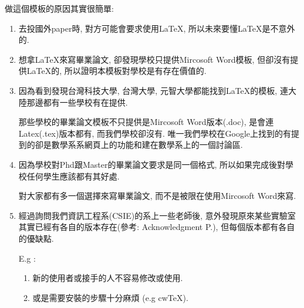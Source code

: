 

做這個模板的原因其實很簡單:

\begin{enumerate}
  \item
  {
    去投國外paper時, 對方可能會要求使用LaTeX, 所以未來要懂LaTeX是不意外的.
  } %

  \item
  {
    想拿LaTeX來寫畢業論文, 卻發現學校只提供Mircosoft Word模板, 但卻沒有提供LaTeX的, 所以證明本模板對學校是有存在價值的.
  } %

  \item
  {
    因為看到發現台灣科技大學\cite{web:latex:template:ntust}, 台灣大學\cite{web:latex:template:ntu}, 元智大學\cite{web:latex:yzu}都能找到LaTeX的模板, 連大陸那邊都有一些學校有在提供.

    那些學校的畢業論文模板不只提供是Mircosoft Word版本(.doc), 是會連Latex(.tex)版本都有, 而我們學校卻沒有. 唯一我們學校在Google上找到的有提到的卻是數學系系網頁上的功能\cite{web:latex:ncku_math_introduction}和建在數學系上的一個討論區\cite{web:latex:ncku_math_forum}.
  } %

  \item
  {
    因為學校對Phd跟Master的畢業論文要求是同一個格式, 所以如果完成後對學校任何學生應該都有其好處.

    對大家都有多一個選擇來寫畢業論文, 而不是被限在使用Mircosoft Word來寫.
  } %

  \item
  {
    經過詢問我們資訊工程系(CSIE)的系上一些老師後, 意外發現原來某些實驗室其實已經有各自的版本存在(參考: Acknowledgment P.), 但每個版本都有各自的優缺點.

    E.g :
    \begin{enumerate}

      \item
      {
        新的使用者或接手的人不容易修改或使用.
      } %

      \item
      {
        或是需要安裝的步驟十分麻煩 (e.g cwTeX).
      } %


\end{enumerate}}
\end{enumerate}
